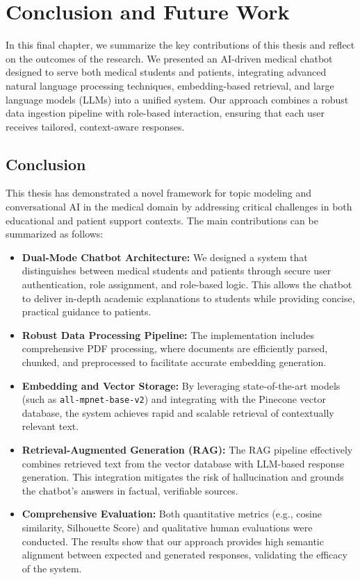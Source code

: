 \chapter{Conclusion and Future Work}

\label{Chapter6}

In this final chapter, we summarize the key contributions of this thesis and reflect on the outcomes of the research. We presented an AI-driven medical chatbot designed to serve both medical students and patients, integrating advanced natural language processing techniques, embedding-based retrieval, and large language models (LLMs) into a unified system. Our approach combines a robust data ingestion pipeline with role-based interaction, ensuring that each user receives tailored, context-aware responses. 

\section{Conclusion}
This thesis has demonstrated a novel framework for topic modeling and conversational AI in the medical domain by addressing critical challenges in both educational and patient support contexts. The main contributions can be summarized as follows:
\begin{itemize}
    \item \textbf{Dual-Mode Chatbot Architecture:} We designed a system that distinguishes between medical students and patients through secure user authentication, role assignment, and role-based logic. This allows the chatbot to deliver in-depth academic explanations to students while providing concise, practical guidance to patients.
    \item \textbf{Robust Data Processing Pipeline:} The implementation includes comprehensive PDF processing, where documents are efficiently parsed, chunked, and preprocessed to facilitate accurate embedding generation.
    \item \textbf{Embedding and Vector Storage:} By leveraging state-of-the-art models (such as \texttt{all-mpnet-base-v2}) and integrating with the Pinecone vector database, the system achieves rapid and scalable retrieval of contextually relevant text.
    \item \textbf{Retrieval-Augmented Generation (RAG):} The RAG pipeline effectively combines retrieved text from the vector database with LLM-based response generation. This integration mitigates the risk of hallucination and grounds the chatbot's answers in factual, verifiable sources.
    \item \textbf{Comprehensive Evaluation:} Both quantitative metrics (e.g., cosine similarity, Silhouette Score) and qualitative human evaluations were conducted. The results show that our approach provides high semantic alignment between expected and generated responses, validating the efficacy of the system.
\end{itemize}


